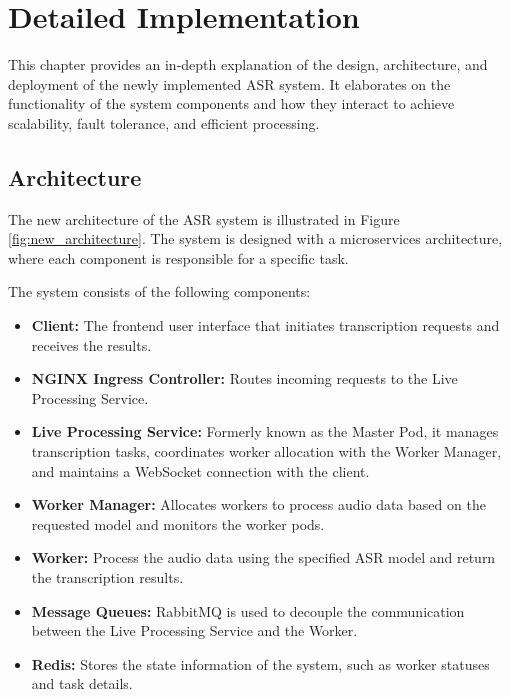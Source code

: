 \chapter{Detailed Implementation} \label{chapter:detailed_implementation}
This chapter provides an in-depth explanation of the design, architecture, and deployment of the newly implemented ASR system. It elaborates on the functionality of the system components and how they interact to achieve scalability, fault tolerance, and efficient processing.

\section{Architecture}
The new architecture of the ASR system is illustrated in Figure \ref{fig:new_architecture}. The system is designed with a microservices architecture, where each component is responsible for a specific task. 

The system consists of the following components:
\begin{itemize}
    \item \textbf{Client:} The frontend user interface that initiates transcription requests and receives the results.
    \item \textbf{NGINX Ingress Controller:} Routes incoming requests to the Live Processing Service.
    \item \textbf{Live Processing Service:} Formerly known as the Master Pod, it manages transcription tasks, coordinates worker allocation with the Worker Manager, and maintains a WebSocket connection with the client.
    \item \textbf{Worker Manager:} Allocates workers to process audio data based on the requested model and monitors the worker pods.
    \item \textbf{Worker:} Process the audio data using the specified ASR model and return the transcription results.
    \item \textbf{Message Queues:} RabbitMQ is used to decouple the communication between the Live Processing Service and the Worker.
    \item \textbf{Redis:} Stores the state information of the system, such as worker statuses and task details.
\end{itemize}

